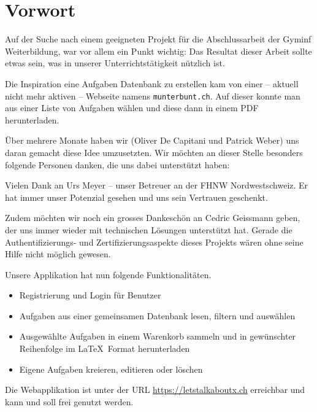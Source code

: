 \section{Vorwort}

Auf der Suche nach einem geeigneten Projekt für die Abschlussarbeit der Gyminf Weiterbildung, war vor allem ein Punkt wichtig: Das Resultat dieser Arbeit sollte etwas sein, was in unserer Unterrichtstätigkeit nützlich ist. 

Die Inspiration eine Aufgaben Datenbank zu erstellen kam von einer -- aktuell nicht mehr aktiven -- Webseite namens \verb|munterbunt.ch|. Auf dieser konnte man aus einer Liste von Aufgaben wählen und diese dann in einem PDF herunterladen. 

Über mehrere Monate haben wir (Oliver De Capitani und Patrick Weber) uns daran gemacht diese Idee umzusetzten. Wir möchten an dieser Stelle besonders folgende Personen danken, die uns dabei unterstützt haben: 

Vielen Dank an Urs Meyer -- unser Betreuer an der FHNW Nordwestschweiz. Er hat immer unser Potenzial gesehen und uns sein Vertrauen geschenkt. 

Zudem möchten wir noch ein grosses Dankeschön an Cedric Geissmann geben, der uns immer wieder mit technischen Lösungen unterstützt hat. Gerade die Authentifizierungs- und Zertifizierungsaspekte dieses Projekts wären ohne seine Hilfe nicht möglich gewesen.

Unsere Applikation hat nun folgende Funktionalitäten.
\begin{itemize}
  \item Registrierung und Login für Benutzer
  \item Aufgaben aus einer gemeinsamen Datenbank lesen, filtern und auswählen
  \item Ausgewählte Aufgaben in einem Warenkorb sammeln und in gewünschter Reihenfolge im \LaTeX\  Format herunterladen
  \item Eigene Aufgaben kreieren, editieren oder löschen
\end{itemize}

Die Webapplikation ist unter der URL \url{https://letstalkaboutx.ch} erreichbar und kann und soll frei genutzt werden.